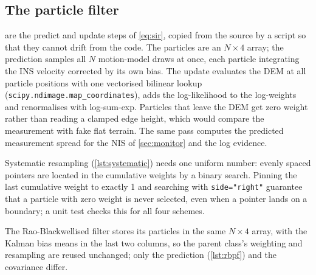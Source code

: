 \subsection{The particle filter}
 are the predict and update steps of \cref{eq:sir}, copied from the
source by a script so that they cannot drift from the code. The particles are an $N\times4$
array; the prediction samples all $N$ motion-model draws at once, each particle integrating the
INS velocity corrected by its own bias. The update evaluates the DEM at all particle positions
with one vectorised bilinear lookup (\texttt{scipy.ndimage.map\_coordinates}), adds the
log-likelihood to the log-weights and renormalises with log-sum-exp. Particles that leave the DEM
get zero weight rather than reading a clamped edge height, which would compare the measurement with
fake flat terrain. The same pass computes the predicted measurement spread for the NIS of
\cref{sec:monitor} and the log evidence.





Systematic resampling (\cref{lst:systematic}) needs one uniform number: evenly spaced pointers
are located in the cumulative weights by a binary search. Pinning the last cumulative weight to
exactly 1 and searching with \texttt{side="right"} guarantee that a particle with zero weight is
never selected, even when a pointer lands on a boundary; a unit test checks this for all four
schemes.



The Rao-Blackwellised filter stores its particles in the same $N\times4$ array, with the Kalman
bias means in the last two columns, so the parent class's weighting and resampling are reused
unchanged; only the prediction (\cref{lst:rbpf}) and the covariance differ.



